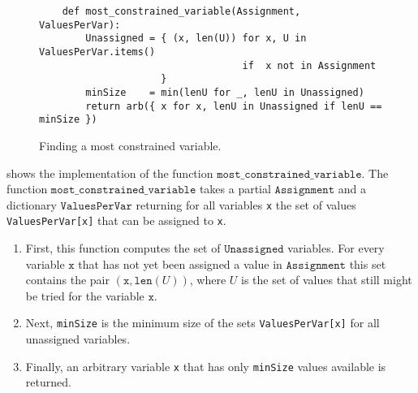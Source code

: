 \begin{figure}[!ht]
\centering
\begin{verbatim}
    def most_constrained_variable(Assignment, ValuesPerVar):
        Unassigned = { (x, len(U)) for x, U in ValuesPerVar.items()
                                   if  x not in Assignment
                     }
        minSize    = min(lenU for _, lenU in Unassigned)
        return arb({ x for x, lenU in Unassigned if lenU == minSize })
\end{verbatim}
\vspace*{-0.3cm}
\caption{Finding a most constrained variable.}
\label{fig:Constraint-Propagation-Solver.ipynb:most_constrained_variable}
\end{figure}

 shows the implementation of the function
$\texttt{most\_constrained\_variable}$.  The function $\texttt{most\_constrained\_variable}$ takes a partial 
$\texttt{Assignment}$ and a dictionary $\texttt{ValuesPerVar}$ returning for all variables \texttt{x} the set
of values \texttt{ValuesPerVar[x]} that can be assigned to \texttt{x}.
\begin{enumerate}
\item First, this function computes the set of $\texttt{Unassigned}$ variables.  For every variable $\texttt{x}$ that
      has not yet been assigned a value in $\texttt{Assignment}$ this set contains the pair 
      $(\texttt{x}, \texttt{len}(U))$, where $U$ is the set of values that still might be tried for the variable  $\texttt{x}$.
\item Next, \texttt{minSize} is the minimum size of the sets \texttt{ValuesPerVar[x]} for all unassigned variables.
\item Finally, an arbitrary variable \texttt{x} that has only \texttt{minSize} values available is returned.
\end{enumerate}

